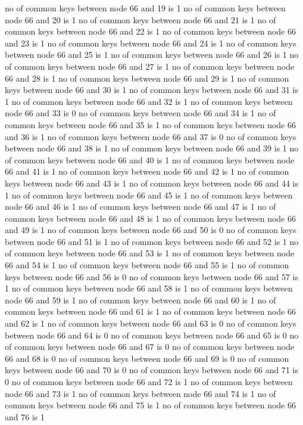 no of common keys between node 66 and 19 is 1
no of common keys between node 66 and 20 is 1
no of common keys between node 66 and 21 is 1
no of common keys between node 66 and 22 is 1
no of common keys between node 66 and 23 is 1
no of common keys between node 66 and 24 is 1
no of common keys between node 66 and 25 is 1
no of common keys between node 66 and 26 is 1
no of common keys between node 66 and 27 is 1
no of common keys between node 66 and 28 is 1
no of common keys between node 66 and 29 is 1
no of common keys between node 66 and 30 is 1
no of common keys between node 66 and 31 is 1
no of common keys between node 66 and 32 is 1
no of common keys between node 66 and 33 is 0
no of common keys between node 66 and 34 is 1
no of common keys between node 66 and 35 is 1
no of common keys between node 66 and 36 is 1
no of common keys between node 66 and 37 is 0
no of common keys between node 66 and 38 is 1
no of common keys between node 66 and 39 is 1
no of common keys between node 66 and 40 is 1
no of common keys between node 66 and 41 is 1
no of common keys between node 66 and 42 is 1
no of common keys between node 66 and 43 is 1
no of common keys between node 66 and 44 is 1
no of common keys between node 66 and 45 is 1
no of common keys between node 66 and 46 is 1
no of common keys between node 66 and 47 is 1
no of common keys between node 66 and 48 is 1
no of common keys between node 66 and 49 is 1
no of common keys between node 66 and 50 is 0
no of common keys between node 66 and 51 is 1
no of common keys between node 66 and 52 is 1
no of common keys between node 66 and 53 is 1
no of common keys between node 66 and 54 is 1
no of common keys between node 66 and 55 is 1
no of common keys between node 66 and 56 is 0
no of common keys between node 66 and 57 is 1
no of common keys between node 66 and 58 is 1
no of common keys between node 66 and 59 is 1
no of common keys between node 66 and 60 is 1
no of common keys between node 66 and 61 is 1
no of common keys between node 66 and 62 is 1
no of common keys between node 66 and 63 is 0
no of common keys between node 66 and 64 is 0
no of common keys between node 66 and 65 is 0
no of common keys between node 66 and 67 is 0
no of common keys between node 66 and 68 is 0
no of common keys between node 66 and 69 is 0
no of common keys between node 66 and 70 is 0
no of common keys between node 66 and 71 is 0
no of common keys between node 66 and 72 is 1
no of common keys between node 66 and 73 is 1
no of common keys between node 66 and 74 is 1
no of common keys between node 66 and 75 is 1
no of common keys between node 66 and 76 is 1
